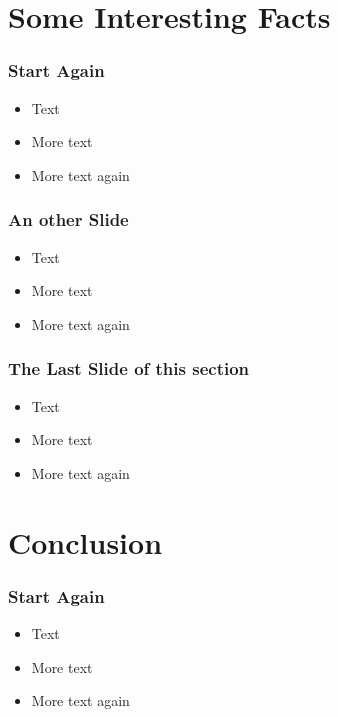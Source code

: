 \documentclass{beamer}
\begin{document}
\section{Some Interesting Facts}

\begin{frame} 
\frametitle{Start Again}
  \begin{itemize}
  \item Text
  \item More text
  \item More text again
  \end{itemize}
\end{frame}


\begin{frame} 
\frametitle{An other Slide}
  \begin{itemize}
  \item Text
  \item More text
  \item More text again
  \end{itemize}
\end{frame}


\begin{frame} 
\frametitle{The Last Slide of this section}
  \begin{itemize}
  \item Text
  \item More text
  \item More text again
  \end{itemize}
\end{frame}

\section{Conclusion}

\begin{frame} 
\frametitle{Start Again}
  \begin{itemize}
  \item Text
  \item More text
  \item More text again
  \end{itemize}
\end{frame}
\end{document}
